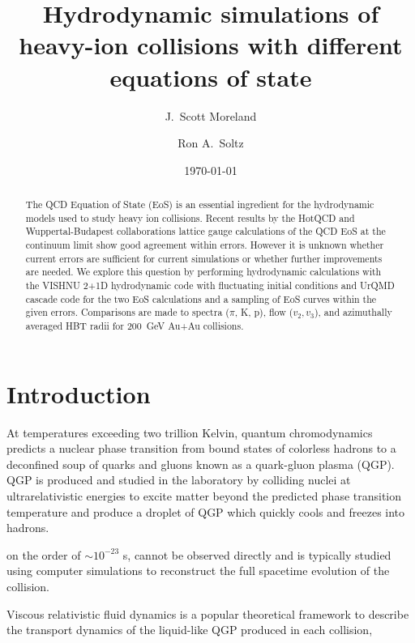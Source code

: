 \documentclass[aps,prc,reprint,amsmath,nofootinbib]{revtex4-1}
\begin{document}
\title{Hydrodynamic simulations of heavy-ion collisions with different equations of state}

\author{J.\ Scott Moreland}
\author{Ron A.\ Soltz}

\date{\today}

\begin{abstract} 
   The QCD Equation of State (EoS) is an essential ingredient for the hydrodynamic models used to study heavy ion collisions.  
   Recent results by the HotQCD and Wuppertal-Budapest collaborations lattice gauge calculations of the QCD EoS at the continuum 
   limit show good agreement within errors.  However it is unknown whether current errors are sufficient for current simulations 
   or whether further improvements are needed.  We explore this question by performing hydrodynamic calculations with the VISHNU 2+1D 
   hydrodynamic code with fluctuating initial conditions and UrQMD cascade code for the two EoS calculations and a sampling of EoS curves 
   within the given errors.  Comparisons are made to spectra ($\pi$, K, p), flow ($v_2, v_3$), and azimuthally averaged HBT radii for 
   200~GeV Au+Au collisions.
\end{abstract}

\maketitle

\section{Introduction}
At temperatures exceeding two trillion Kelvin, quantum chromodynamics predicts a nuclear phase transition  from bound states of colorless hadrons
to a deconfined soup of quarks and gluons known as a quark-gluon plasma (QGP). QGP is produced and studied in the laboratory by colliding nuclei at 
ultrarelativistic energies to excite matter beyond the predicted phase transition temperature and produce a droplet of QGP which quickly cools and freezes into 
hadrons.



on the order of $\sim 10^{-23}$ s, cannot be observed directly and is typically
studied using computer simulations to reconstruct the full spacetime evolution of the collision.

Viscous relativistic fluid dynamics is a popular theoretical framework to describe the transport dynamics of the liquid-like QGP produced in each collision,
\end{document}
